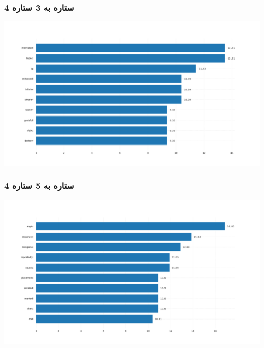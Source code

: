 \subsubsection{\Large 4 ستاره به 3 ستاره}
            { \selectfont \setLR
            \begin{center}
            \includegraphics[scale=0.4]{Images/rel_norm_freq_4_3.png}
            \end{center}
            \begin{adjustbox}{width=\textwidth}
            \end{adjustbox}
            }
\subsubsection{\Large 4 ستاره به 5 ستاره}
            { \selectfont \setLR
            \begin{center}
            \includegraphics[scale=0.4]{Images/rel_norm_freq_4_5.png}
            \end{center}
            \begin{adjustbox}{width=\textwidth}
            \end{adjustbox}
            }
